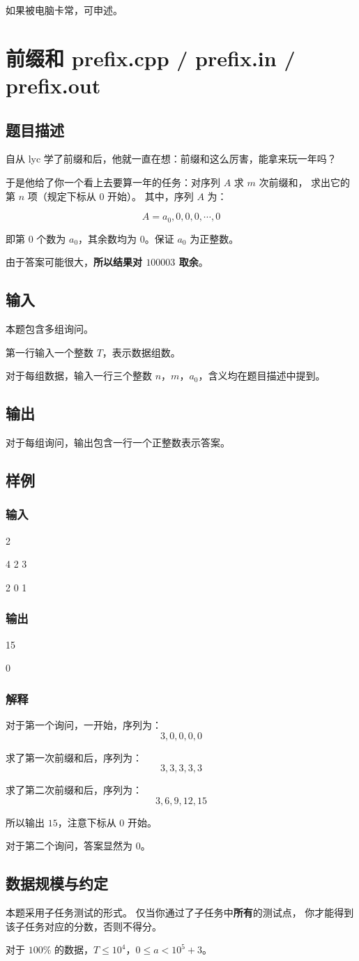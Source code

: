 \documentclass[UTF8]{article}
\newcommand \Problem [2] {\newpage \section{#1 \small{#2.cpp / #2.in / #2.out}}}
\newcommand \Description {\subsection{题目描述}}
\newcommand \Input {\subsection{输入}}
\newcommand \Output {\subsection{输出}}
\newcommand \Sample [1][] {\subsection{样例 #1}}
\newcommand \SampleInput {\subsubsection{输入}}
\newcommand \SampleOutput {\subsubsection{输出}}
\newcommand \Explanation {\subsubsection{解释}}
\newcommand \Constraint {\subsection{数据规模与约定}}
\begin{document}
	\begin{center}
		\begin{Large}
			如果被电脑卡常，可申述。
		\end{Large}
	\end{center}

	\Problem {前缀和} {prefix}
	\Description

	自从 lyc 学了前缀和后，他就一直在想：前缀和这么厉害，能拿来玩一年吗？

	于是他给了你一个看上去要算一年的任务：对序列 $A$ 求 $m$ 次前缀和，
	求出它的第 $n$ 项（规定下标从 $0$ 开始）。
	其中，序列 $A$ 为：

	$$
	A = a_0, 0, 0, 0, \cdots, 0
	$$

	即第 $0$ 个数为 $a_0$，其余数均为 $0$。保证 $a_0$ 为正整数。

	由于答案可能很大，\textbf{所以结果对 $100003$ 取余}。

	\Input

	本题包含多组询问。

	第一行输入一个整数 $T$，表示数据组数。

	对于每组数据，输入一行三个整数 $n$，$m$，$a_0$，含义均在题目描述中提到。

	\Output

	对于每组询问，输出包含一行一个正整数表示答案。

	\Sample
	\SampleInput

	2

	4 2 3

	2 0 1

	\SampleOutput

	15

	0

	\Explanation

	对于第一个询问，一开始，序列为：
	$$
	3, 0, 0, 0, 0
	$$

	求了第一次前缀和后，序列为：
	$$
	3, 3, 3, 3, 3
	$$

	求了第二次前缀和后，序列为：
	$$
	3, 6, 9, 12, 15
	$$

	所以输出 $15$，注意下标从 $0$ 开始。

	\bigskip

	对于第二个询问，答案显然为 $0$。

	\Constraint

	本题采用子任务测试的形式。
	仅当你通过了子任务中\textbf{所有}的测试点，
	你才能得到该子任务对应的分数，否则不得分。

	\bigskip

	对于 $100 \%$ 的数据，$T \le 10^4$，$0 \le a < 10^5 + 3$。
\end{document}
